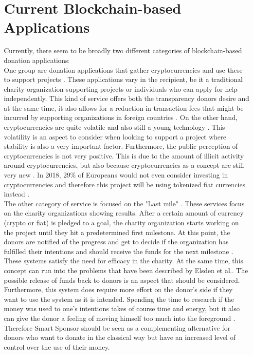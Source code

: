 \section{Current Blockchain-based Applications}
Currently, there seem to be broadly two different categories of blockchain-based donation applications:\\
One group are donation applications that gather cryptocurrencies and use these to support projects \cite{bitgive}\cite{binance}\cite{giveBlock}\cite{engiven}. These applications vary in the recipient, be it a traditional charity organization supporting projects or individuals who can apply for help independently. This kind of service offers both the transparency donors desire and at the same time, it also allows for a reduction in transaction fees that might be incurred by supporting organizations in foreign countries \cite{engiven}. On the other hand, cryptocurrencies are quite volatile and also still a young technology \cite{willing}. This volatility is an aspect to consider when looking to support a project where stability is also a very important factor. Furthermore, the public perception of cryptocurrencies is not very positive. This is due to the amount of illicit activity around cryptocurrencies, but also because cryptocurrencies as a concept are still very new \cite{willing}. In 2018, 29\% of Europeans would not even consider investing in cryptocurrencies and therefore this project will be using tokenized fiat currencies instead \cite{willing}.\\
The other category of service is focused on the "Last mile" \cite{progDon}. These services focus on the charity organizations showing results. After a certain amount of currency (crypto or fiat) is pledged to a goal, the charity organization starts working on the project until they hit a predetermined first milestone. At this point, the donors are notified of the progress and get to decide if the organization has fulfilled their intentions and should receive the funds for the next milestone \cite{alice}\cite{promisegive}.\\
These systems satisfy the need for efficacy in the charity. At the same time, this concept can run into the problems that have been described by Elsden et al.\cite{progDon}. The possible release of funds back to donors is an aspect that should be considered. Furthermore, this system does require more effort on the donor's side if they want to use the system as it is intended. Spending the time to research if the money was used to one's intentions takes of course time and energy, but it also can give the donor a feeling of moving himself too much into the foreground \cite{progDon}. Therefore Smart Sponsor should be seen as a complementing alternative for donors who want to donate in the classical way but have an increased level of control over the use of their money.
